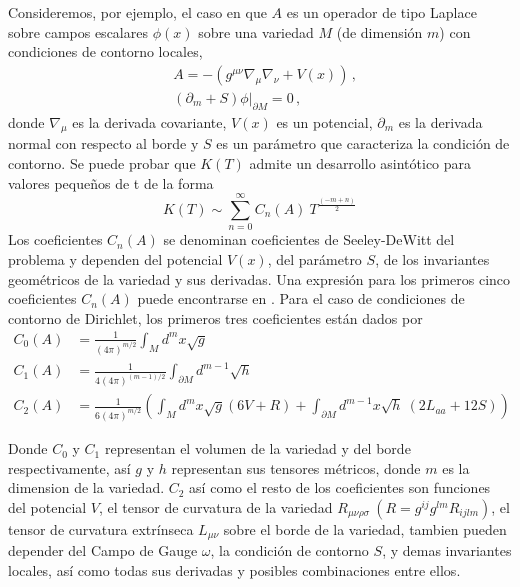 Consideremos, por ejemplo, el caso en que $A$ es un operador de tipo Laplace sobre campos escalares $\phi(x)$ sobre una variedad $M$ (de dimensión $m$) con condiciones de contorno locales,
\begin{align}
&A = - \left(
			g ^{\mu \nu} \nabla _{\mu} \nabla _{\nu} + V(x)	\right) \,,\\[2mm]
&\left (\partial _m + S \right) \phi | _{\partial M} = 0\,,
\end{align}
donde $\nabla _{\mu}$ es la derivada covariante, $V(x)$ es un potencial, $\partial _m$ es la derivada normal con respecto al borde y $S$ es un parámetro que caracteriza la condición de contorno. Se puede probar \cite{10.2307/2373309,10.2307/2373078} que $K(T)$ admite un desarrollo asintótico para valores pequeños de t  de la forma
\begin{equation}
K(T) \sim 
\sum _{n=0} ^{\infty}
C _n (A) \ 
T^{\frac{(-m+n)}{2}} 
\label{eq.heat.expansion}
\end{equation}
Los coeficientes $C_n(A)$ se denominan coeficientes de Seeley-DeWitt del problema y dependen del potencial $V(x)$, del parámetro $S$, de los invariantes geométricos de la variedad y sus derivadas. Una expresión para los primeros cinco coeficientes $C _n (A) $ puede encontrarse en \cite{Vassilevich:2003xt}. Para el caso de condiciones de contorno de Dirichlet, los primeros tres coeficientes están dados por
\begin{align}
C _0 (A) &= \frac{1}{(4 \pi ) ^{m/2} }  \int  _{M} d ^m x \sqrt{g}  \\[2mm]
C _1 (A) &= \frac{ 1 }{4 (4 \pi ) ^{(m-1)/2} } \int _{\partial M } d ^{m-1} \sqrt{h} \\[2mm]
C _2 (A) &= \frac{ 1 }{6 (4 \pi) ^{m/2} } \left(
									\int _M d ^m x\sqrt{g} (6 V + R) +
									\int _{\partial M } d ^{m-1} x 
									\sqrt{h} \ ( 2 L _{aa} + 12 S )
									\right)
\label{coef}
\end{align} 

Donde $C _0$ y $C _1$ representan el volumen de la variedad y del borde respectivamente, así $g$ y $h$ representan sus tensores métricos, donde $m$ es la dimension de la variedad. $C _2$ así como el resto de los coeficientes son funciones del potencial $V$, el tensor de curvatura de la variedad $R _{\mu \nu \rho \sigma } \ (R =  g ^{i j} g^{ l m } R _{i j l m} ) $, el tensor de curvatura extrínseca $L _{\mu \nu }$ sobre el borde de la variedad, tambien pueden depender del Campo de Gauge $\omega $, la condición de contorno $S$, y demas invariantes locales, así como todas sus derivadas y posibles combinaciones entre ellos.


